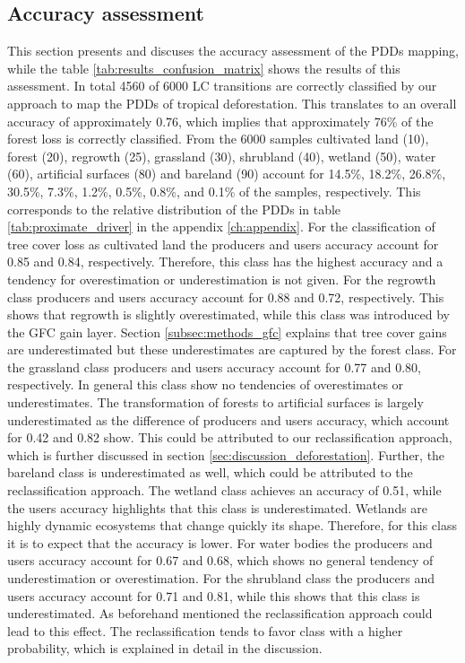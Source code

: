 		\subsection{Accuracy assessment}
		\label{subsec:results_accuracy_assessment}
			This section presents and discuses the accuracy assessment of the \acp{PDD} mapping, while the table \ref{tab:results_confusion_matrix} shows the results of this assessment. In total 4560 of 6000 \ac{LC} transitions are correctly classified by our approach to map the \acp{PDD} of tropical deforestation. This translates to an overall accuracy of approximately 0.76, which implies that approximately 76\% of the forest loss is correctly classified. From the 6000 samples cultivated land (10), forest (20), regrowth (25), grassland (30), shrubland (40), wetland (50), water (60), artificial surfaces (80) and bareland (90) account for 14.5\%, 18.2\%, 26.8\%, 30.5\%, 7.3\%, 1.2\%, 0.5\%, 0.8\%, and 0.1\% of the samples, respectively. This corresponds to the relative distribution of the  \acp{PDD} in table \ref{tab:proximate_driver} in the appendix \ref{ch:appendix}. For the classification of tree cover loss as cultivated land the producers and users accuracy account for 0.85 and 0.84, respectively. Therefore, this class has the highest accuracy and a tendency for overestimation or underestimation is not given. For the regrowth class producers and users accuracy account for 0.88 and 0.72, respectively. This shows that regrowth is slightly overestimated, while this class was introduced by the \ac{GFC} gain layer. Section \ref{subsec:methods_gfc} explains that tree cover gains are underestimated but these underestimates are captured by the forest class. For the grassland class producers and users accuracy account for 0.77 and 0.80, respectively. In general this class show no tendencies of overestimates or underestimates. The transformation of forests to artificial surfaces is largely underestimated as the difference of producers and users accuracy, which account for 0.42 and 0.82 show. This could be attributed to our reclassification approach, which is further discussed in section \ref{sec:discussion_deforestation}. Further, the bareland class is underestimated as well, which could be attributed to the reclassification approach. The wetland class achieves an accuracy of 0.51, while the users accuracy highlights that this class is underestimated. Wetlands are highly dynamic ecosystems that change quickly its shape. Therefore, for this class it is to expect that the accuracy is lower. For water bodies the producers and users accuracy account for 0.67 and 0.68, which shows no general tendency of underestimation or overestimation. For the shrubland class the producers and users accuracy account for 0.71 and 0.81, while this shows that this class is underestimated. As beforehand mentioned the reclassification approach could lead to this effect. The reclassification tends to favor class with a higher probability, which is explained in detail in the discussion.
